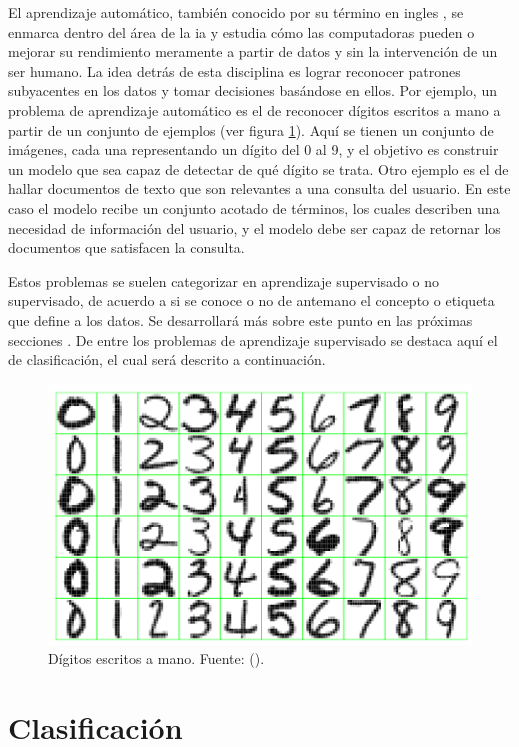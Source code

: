 El aprendizaje automático, también conocido por su término en ingles
, se enmarca dentro del área de la
\acrfull{ia} y estudia cómo las computadoras pueden  o
mejorar su rendimiento meramente a partir de datos y sin la intervención de un
ser humano.  La idea detrás de esta disciplina es lograr reconocer patrones
subyacentes en los datos y tomar decisiones basándose en ellos. Por ejemplo, un
problema de aprendizaje automático es el de reconocer dígitos escritos a mano a
partir de un conjunto de ejemplos (ver figura \ref{fig:reconocimiento_digitos}).
Aquí se tienen un conjunto de imágenes, cada una representando un dígito del 0
al 9, y el objetivo es construir un modelo que sea capaz de detectar de qué
dígito se trata. Otro ejemplo es el de hallar documentos de texto que son
relevantes a una consulta del usuario. En este caso el modelo recibe un conjunto
acotado de términos, los cuales describen una necesidad de información del
usuario, y el modelo debe ser capaz de retornar los documentos que satisfacen la
consulta.

Estos problemas se suelen categorizar en aprendizaje supervisado o no
supervisado, de acuerdo a si se conoce o no de antemano el concepto o etiqueta
que define a los datos. Se desarrollará más sobre este punto en las próximas
secciones . De
entre los problemas de aprendizaje supervisado se destaca aquí el de
clasificación, el cual será descrito a continuación.

\begin{figure}
	\includegraphics[width=0.66\linewidth]{figures/digits_recognition_v2.png}
	\centering
	\caption{Dígitos escritos a mano. Fuente: 
		(\citeyear{hastie_elements_2009}).}
	\label{fig:reconocimiento_digitos}
\end{figure}

\section{Clasificación}


